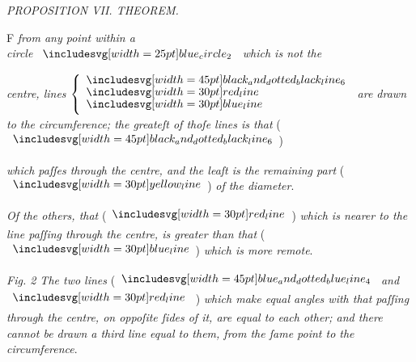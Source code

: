 \documentclass[12pt,preview]{standalone}
\begin{document}
\begin{minipage}[t]{0.54\textwidth}
    \begin{center}
        \textit{PROPOSITION VII. THEOREM.}\label{book3pr7}\\
    \end{center}

    \hfill

    \begin{center}
        \raggedright \lettrine[lines=3, loversize=1, nindent=0pt]{}{}F \textit{from any point within a\\ circle} $\img{blue_circle_2}$ \textit{which is not the}
    \end{center}
    \textit{centre, lines} $\left\{\begin{aligned} & \bimg{black_and_dotted_black_line_6} \\[-2ex] & \redline \\[-2ex] & \blueline \end{aligned}\right.$ \textit{are drawn to the circumference; the greateſt of thoſe lines is that} (\hspace{-1ex}$\bimg{black_and_dotted_black_line_6}$\hspace{-1ex}) \raggedright \textit{which paſſes through the centre, and the leaſt is the remaining part} (\hspace{-1ex}$\yellowline$\hspace{-1ex}) \textit{of the diameter}.

    \hfill

    \textit{Of the others, that} (\hspace{-1ex}$\redline$\hspace{-1ex}) \textit{which is nearer to the line paſſing through the centre, is greater than that} (\hspace{-1ex}$\blueline$\hspace{-1ex}) \textit{which is more remote}.

    \hfill

    \textit{Fig. 2 The two lines} (\hspace{-1ex}$\bimg{blue_and_dotted_blue_line_4}$ \textit{and} $\redline$ \hspace{-1ex}) \textit{which make equal angles with that paſſing through the centre, on oppoſite ſides of it, are equal to each other; and there cannot be drawn a third line equal to them, from the ſame point to the circumference}.
\end{minipage}%
\end{document}
